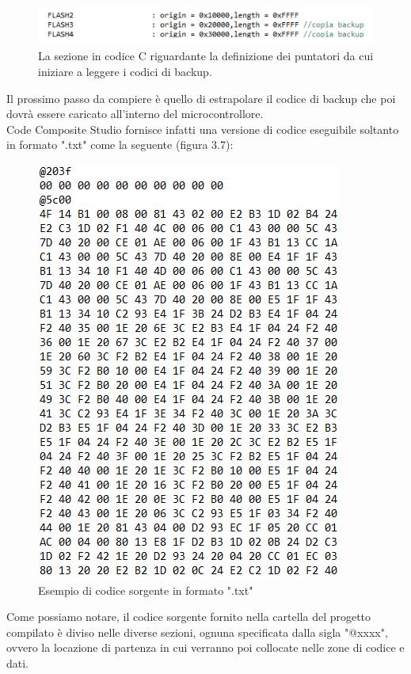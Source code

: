 \documentclass[LaM,binding=0.6cm,oneside]{../sapthesis}
\begin{document}
\begin{figure}[htbp]
\centerline{\includegraphics[scale=.67]{examples/PuntatoriDiStartBootloader.PNG}}
\caption{La sezione in codice C riguardante la definizione dei puntatori da cui iniziare a leggere i codici di backup.}
\label{fig}
\end{figure}

Il prossimo passo da compiere è quello di estrapolare il codice di backup che poi dovrà essere caricato all'interno del microcontrollore. \\
Code Composite Studio fornisce infatti una versione di codice eseguibile soltanto in formato ".txt" come la seguente (figura 3.7):
\begin{figure}[htbp]
\centerline{\includegraphics[scale=.67]{examples/TxtCodeBootloader.PNG}}
\caption{Esempio di codice sorgente in formato ".txt"}
\label{fig}
\end{figure}

Come possiamo notare, il codice sorgente fornito nella cartella del progetto compilato è diviso nelle diverse sezioni, ognuna specificata dalla sigla "@xxxx", ovvero la locazione di partenza in cui verranno poi collocate nelle zone di codice e dati. 
\end{document}
